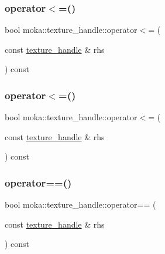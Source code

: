 \mbox{\label{structmoka_1_1texture__handle_ac5ddcdc527e92d6ac4affd53d0628d89}} 
\subsubsection{\texorpdfstring{operator$<$=()}{operator<=()}\hspace{0.1cm}{\footnotesize\ttfamily [1/2]}}
{\footnotesize\ttfamily bool moka\+::texture\+\_\+handle\+::operator$<$= (\begin{DoxyParamCaption}\item[{const \mbox{\hyperlink{structmoka_1_1texture__handle}{texture\+\_\+handle}} \&}]{rhs }\end{DoxyParamCaption}) const}

\mbox{\label{structmoka_1_1texture__handle_ac5ddcdc527e92d6ac4affd53d0628d89}} 
\subsubsection{\texorpdfstring{operator$<$=()}{operator<=()}\hspace{0.1cm}{\footnotesize\ttfamily [2/2]}}
{\footnotesize\ttfamily bool moka\+::texture\+\_\+handle\+::operator$<$= (\begin{DoxyParamCaption}\item[{const \mbox{\hyperlink{structmoka_1_1texture__handle}{texture\+\_\+handle}} \&}]{rhs }\end{DoxyParamCaption}) const}

\mbox{\label{structmoka_1_1texture__handle_a3b3c615c09b9b4e36ae970286ed4612b}} 
\subsubsection{\texorpdfstring{operator==()}{operator==()}\hspace{0.1cm}{\footnotesize\ttfamily [1/2]}}
{\footnotesize\ttfamily bool moka\+::texture\+\_\+handle\+::operator== (\begin{DoxyParamCaption}\item[{const \mbox{\hyperlink{structmoka_1_1texture__handle}{texture\+\_\+handle}} \&}]{rhs }\end{DoxyParamCaption}) const}

